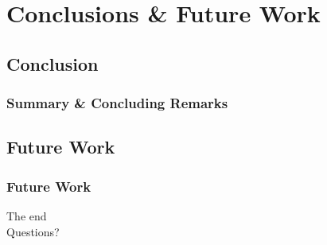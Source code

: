 \documentclass[hyperref={pdfpagelabels=false}]{beamer}
\begin{document}
\section{Conclusions \& Future Work}
\subsection{Conclusion}
\begin{frame} \frametitle{Summary \& Concluding Remarks}

\end{frame}
\subsection{Future Work}
\begin{frame} \frametitle{Future Work}

\end{frame}

\begin{frame}[plain]
\centering
The end\\
Questions?
\end{frame}
\end{document}
